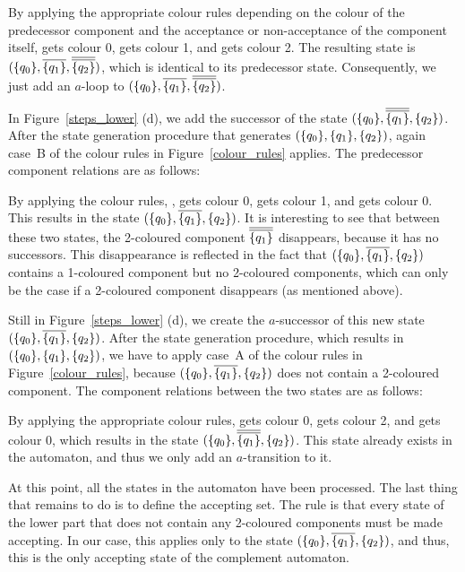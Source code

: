 By applying the appropriate colour rules depending on the colour of the predecessor component and the acceptance or non-acceptance of the component itself,  gets colour 0,  gets colour 1, and  gets colour 2. The resulting state is $(\qm0, \cl1{\qm1}, \cl2{\qm2})$, which is identical to its predecessor state. Consequently, we just add an $a$-loop to $(\qm0, \cl1{\qm1}, \cl2{\qm2})$.

In Figure~\ref{steps_lower} (d), we add the successor of the state $(\qm0, \cl2{\qm1}, \qm2)$. After the state generation procedure that generates $(\{q_{0}\}, \{q_{1}\}, \{q_{2}\})$, again case~B of the colour rules in Figure~\ref{colour_rules} applies. The predecessor component relations are as follows:

\begin{center}
\PredCompsThree
\end{center}

By applying the colour rules,  , gets colour 0,  gets colour 1, and  gets colour 0. This results in the state $(\qm0, \cl1{\qm1}, \qm2)$. It is interesting to see that between these two states, the 2-coloured component $\cl2{\qm1}$ disappears, because it has no successors. This disappearance is reflected in the fact that $(\qm0, \cl1{\qm1}, \qm2)$ contains a 1-coloured component but no 2-coloured components, which can only be the case if a 2-coloured component disappears (as mentioned above).

Still in Figure~\ref{steps_lower} (d), we create the $a$-successor of this new state $(\qm0, \cl1{\qm1}, \qm2)$. After the state generation procedure, which results in $(\{q_{0}\}, \{q_{1}\}, \{q_{2}\})$, we have to apply case~A of the colour rules in Figure~\ref{colour_rules}, because $(\qm0, \cl1{\qm1}, \qm2)$ does not contain a 2-coloured component. The component relations between the two states are as follows:

\begin{center}
\PredCompsFour
\end{center}

By applying the appropriate colour rules,  gets colour 0,  gets colour 2, and  gets colour 0, which results in the state $(\qm0, \cl2{\qm1}, \qm2)$. This state already exists in the automaton, and thus we only add an $a$-transition to it.

At this point, all the states in the automaton have been processed. The last thing that remains to do is to define the accepting set. The rule is that every state of the lower part that does not contain any 2-coloured components must be made accepting. In our case, this applies only to the state $(\qm0, \cl1{\qm1}, \qm2)$, and thus, this is the only accepting state of the complement automaton.

